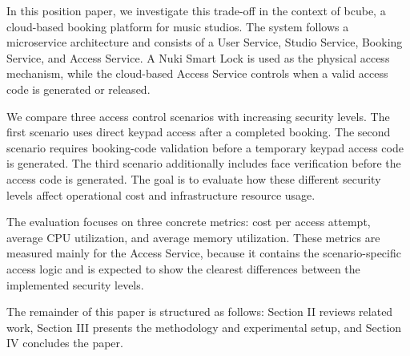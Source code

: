 In this position paper, we investigate this trade-off in the context of bcube, a cloud-based booking platform for music studios. The system follows a microservice architecture and consists of a User Service, Studio Service, Booking Service, and Access Service. A Nuki Smart Lock is used as the physical access mechanism, while the cloud-based Access Service controls when a valid access code is generated or released.

We compare three access control scenarios with increasing security levels. The first scenario uses direct keypad access after a completed booking. The second scenario requires booking-code validation before a temporary keypad access code is generated. The third scenario additionally includes face verification before the access code is generated. The goal is to evaluate how these different security levels affect operational cost and infrastructure resource usage.

The evaluation focuses on three concrete metrics: cost per access attempt, average CPU utilization, and average memory utilization. These metrics are measured mainly for the Access Service, because it contains the scenario-specific access logic and is expected to show the clearest differences between the implemented security levels.

The remainder of this paper is structured as follows: Section II reviews related work, Section III presents the methodology and experimental setup, and Section IV concludes the paper.